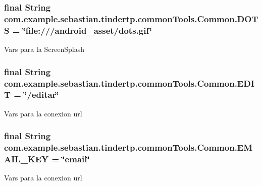 \subsubsection[{\texorpdfstring{D\+O\+TS}{DOTS}}]{\setlength{\rightskip}{0pt plus 5cm}final String com.\+example.\+sebastian.\+tindertp.\+common\+Tools.\+Common.\+D\+O\+TS = \char`\"{}file\+:///android\+\_\+asset/dots.\+gif\char`\"{}\hspace{0.3cm}{\ttfamily [static]}}\hypertarget{classcom_1_1example_1_1sebastian_1_1tindertp_1_1commonTools_1_1Common_af9ff2dd415fc9361e082cf3877c8c635}{}\label{classcom_1_1example_1_1sebastian_1_1tindertp_1_1commonTools_1_1Common_af9ff2dd415fc9361e082cf3877c8c635}
Vars para la Screen\+Splash 
\subsubsection[{\texorpdfstring{E\+D\+IT}{EDIT}}]{\setlength{\rightskip}{0pt plus 5cm}final String com.\+example.\+sebastian.\+tindertp.\+common\+Tools.\+Common.\+E\+D\+IT = \char`\"{}/editar\char`\"{}\hspace{0.3cm}{\ttfamily [static]}}\hypertarget{classcom_1_1example_1_1sebastian_1_1tindertp_1_1commonTools_1_1Common_a55102a3c9815bdf347b4d124d0e52a76}{}\label{classcom_1_1example_1_1sebastian_1_1tindertp_1_1commonTools_1_1Common_a55102a3c9815bdf347b4d124d0e52a76}
Vars para la conexion url 
\subsubsection[{\texorpdfstring{E\+M\+A\+I\+L\+\_\+\+K\+EY}{EMAIL\_KEY}}]{\setlength{\rightskip}{0pt plus 5cm}final String com.\+example.\+sebastian.\+tindertp.\+common\+Tools.\+Common.\+E\+M\+A\+I\+L\+\_\+\+K\+EY = \char`\"{}email\char`\"{}\hspace{0.3cm}{\ttfamily [static]}}\hypertarget{classcom_1_1example_1_1sebastian_1_1tindertp_1_1commonTools_1_1Common_a1e32ec84b98617bbaf3beb96aefc259c}{}\label{classcom_1_1example_1_1sebastian_1_1tindertp_1_1commonTools_1_1Common_a1e32ec84b98617bbaf3beb96aefc259c}
Vars para la conexion url 
